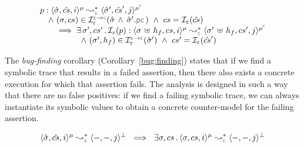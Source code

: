 
\vspace*{-0.1cm}
\begin{theorem}\label{teo:soundness:jsil:symb:exe}
$$
\begin{array}{l}
\prog : \transabssemrule{\sstate, \scs, i}{\sstate', \scs', j}{\mode}{\mode'}{\symbolic} 
    \\ \quad \wedge \ (\jstate, \cs) \in \interpret{\symbconc}{\senv}(\sstate \, \wedge \, \sstate'.\pcsel) \ \wedge \ \cs = \shorthand(\scs) \\ \qquad \implies \exists \, \jstate', \cs' \, . \,
        \shorthand(\prog) : \transabssemrule{\jstate \dunion \heap_f, \cs, i}{\jstate' \dunion \heap_f, \cs', j}{\mode}{\mode'}{\concrete} \\ \qquad \qquad \quad
               \wedge \ (\jstate', \heap_f) \in \interpret{\symbconc}{\senv}(\sstate')
               \ \wedge \ \cs' = \shorthand(\scs')
\end{array}
$$
\end{theorem}

The \emph{bug-finding} corollary (Corollary~\ref{bug:finding}) states that if 
we find a symbolic trace that results in a failed assertion, 
then there also exists a concrete execution for which that assertion fails.
The analysis is designed in such a way that there are no false positives: 
if we find a failing symbolic trace,
we can always instantiate its symbolic values to obtain a concrete counter-model for the 
failing assertion. %

\vspace*{-0.1cm}
\begin{corollary}\label{bug:finding}
$$
\transabssemrule{\sstate, \scs, i}{-, -, j}{\mode}{\bot}{\symbolic}  
      \ \implies \  \exists \jstate, \cs \, . \, \transabssemrule{\jstate, \cs, i}{-, -, j}{\mode}{\bot}{\concrete} 
$$
\end{corollary}

